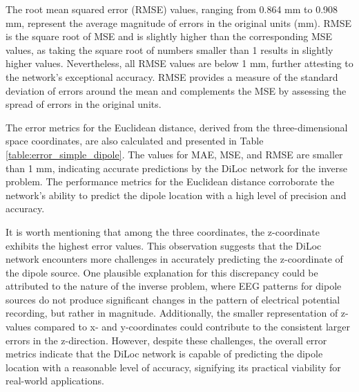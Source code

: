 \documentclass[a4paper, UKenglish, 11pt]{uiomaster}
\begin{document}
The root mean squared error (RMSE) values, ranging from 0.864 mm to 0.908 mm, represent the average magnitude of errors in the original units (mm). RMSE is the square root of MSE and is slightly higher than the corresponding MSE values, as taking the square root of numbers smaller than 1 results in slightly higher values. Nevertheless, all RMSE values are below 1 mm, further attesting to the network's exceptional accuracy. RMSE provides a measure of the standard deviation of errors around the mean and complements the MSE by assessing the spread of errors in the original units.

The error metrics for the Euclidean distance, derived from the three-dimensional space coordinates, are also calculated and presented in Table \ref{table:error_simple_dipole}. The values for MAE, MSE, and RMSE are smaller than 1 mm, indicating accurate predictions by the DiLoc network for the inverse problem. The performance metrics for the Euclidean distance corroborate the network's ability to predict the dipole location with a high level of precision and accuracy.

It is worth mentioning that among the three coordinates, the z-coordinate exhibits the highest error values. This observation suggests that the DiLoc network encounters more challenges in accurately predicting the z-coordinate of the dipole source. One plausible explanation for this discrepancy could be attributed to the nature of the inverse problem, where EEG patterns for dipole sources do not produce significant changes in the pattern of electrical potential recording, but rather in magnitude. Additionally, the smaller representation of z-values compared to x- and y-coordinates could contribute to the consistent larger errors in the z-direction. However, despite these challenges, the overall error metrics indicate that the DiLoc network is capable of predicting the dipole location with a reasonable level of accuracy, signifying its practical viability for real-world applications.
\end{document}
